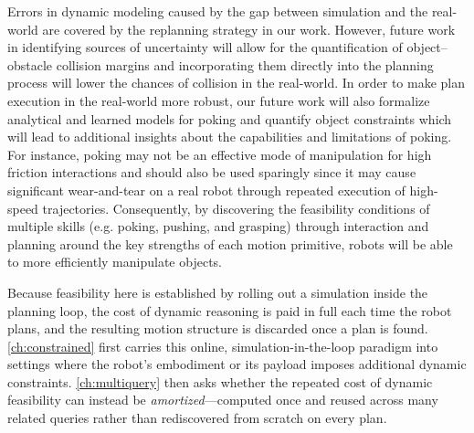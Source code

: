 Errors in dynamic modeling caused by the gap between simulation and the real-world are covered by the replanning strategy in our work. However, future work in identifying sources of uncertainty will allow for the quantification of object--obstacle collision margins and incorporating them directly into the planning process will lower the chances of collision in the real-world. In order to make plan execution in the real-world more robust, our future work will also formalize analytical and learned models for poking and quantify object constraints which will lead to additional insights about the capabilities and limitations of poking. For instance, poking may not be an effective mode of manipulation for high friction interactions and should also be used sparingly since it may cause significant wear-and-tear on a real robot through repeated execution of high-speed trajectories. Consequently, by discovering the feasibility conditions of multiple skills (e.g. poking, pushing, and grasping) through interaction and planning around the key strengths of each motion primitive, robots will be able to more efficiently manipulate objects.

Because feasibility here is established by rolling out a simulation inside the planning loop, the cost of dynamic reasoning is paid in full each time the robot plans, and the resulting motion structure is discarded once a plan is found.
\cref{ch:constrained} first carries this online, simulation-in-the-loop paradigm into settings where the robot's embodiment or its payload imposes additional dynamic constraints.
\cref{ch:multiquery} then asks whether the repeated cost of dynamic feasibility can instead be \emph{amortized}---computed once and reused across many related queries rather than rediscovered from scratch on every plan.
